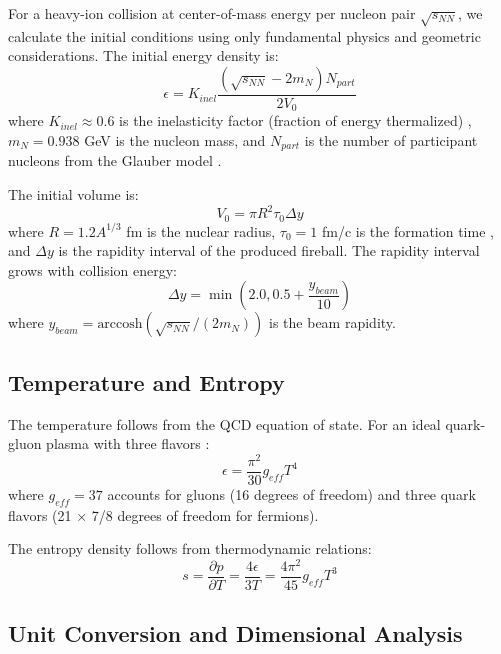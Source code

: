 \documentclass[12pt,a4paper]{article}
\begin{document}
For a heavy-ion collision at center-of-mass energy per nucleon pair $\sqrt{s_{NN}}$, we calculate the initial conditions using only fundamental physics and geometric considerations. The initial energy density is:
\begin{equation}
\epsilon = K_{inel} \frac{(\sqrt{s_{NN}} - 2m_N) N_{part}}{2V_0}
\label{eq:energy_density}
\end{equation}
where $K_{inel} \approx 0.6$ is the inelasticity factor (fraction of energy thermalized) \cite{Bjorken1983}, $m_N = 0.938$ GeV is the nucleon mass, and $N_{part}$ is the number of participant nucleons from the Glauber model \cite{Miller2007}.

The initial volume is:
\begin{equation}
V_0 = \pi R^2 \tau_0 \Delta y
\label{eq:volume}
\end{equation}
where $R = 1.2 A^{1/3}$ fm is the nuclear radius, $\tau_0 = 1$ fm/c is the formation time \cite{Bjorken1983}, and $\Delta y$ is the rapidity interval of the produced fireball. The rapidity interval grows with collision energy:
\begin{equation}
\Delta y = \min\left(2.0, 0.5 + \frac{y_{beam}}{10}\right)
\label{eq:rapidity}
\end{equation}
where $y_{beam} = \text{arccosh}(\sqrt{s_{NN}}/(2m_N))$ is the beam rapidity.

\subsection{Temperature and Entropy}

The temperature follows from the QCD equation of state. For an ideal quark-gluon plasma with three flavors \cite{Kapusta2006}:
\begin{equation}
\epsilon = \frac{\pi^2}{30} g_{eff} T^4
\label{eq:eos}
\end{equation}
where $g_{eff} = 37$ accounts for gluons (16 degrees of freedom) and three quark flavors (21 × 7/8 degrees of freedom for fermions).

The entropy density follows from thermodynamic relations:
\begin{equation}
s = \frac{\partial p}{\partial T} = \frac{4\epsilon}{3T} = \frac{4\pi^2}{45} g_{eff} T^3
\label{eq:entropy_density}
\end{equation}

\subsection{Unit Conversion and Dimensional Analysis}
\end{document}
